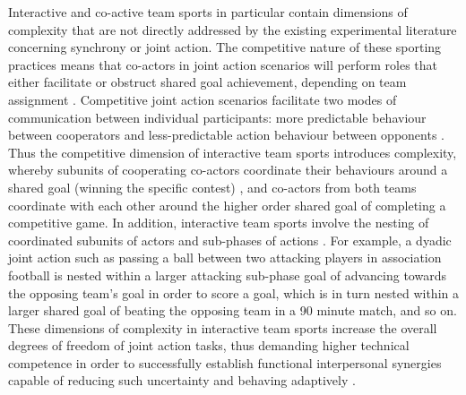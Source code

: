 Interactive and co-active team sports in particular contain dimensions of complexity that are not directly addressed by the existing experimental literature concerning synchrony or joint action.  The competitive nature of these sporting practices means that co-actors in joint action scenarios will perform roles that either facilitate or obstruct shared goal achievement, depending on team assignment \citep{Renshaw2009}. Competitive joint action scenarios facilitate two modes of communication between individual participants: more predictable behaviour between cooperators and less-predictable action behaviour between opponents \citep{Glover2017}. Thus the competitive dimension of interactive team sports introduces complexity, whereby subunits of cooperating co-actors coordinate their behaviours around a shared goal (winning the specific contest) \citep{Passos2012},  and co-actors from both teams coordinate with each other around the higher order shared goal of completing a competitive game.
In addition, interactive team sports involve the nesting of coordinated subunits of actors and sub-phases of actions \citep{Vilar2012}.  For example, a dyadic joint action such as passing a ball between two attacking players in association football is nested within a larger attacking sub-phase goal of advancing towards the opposing team's goal in order to score a goal, which is in turn nested within a larger shared goal of beating the opposing team in a 90 minute match, and so on.  These dimensions of complexity in interactive team sports increase the overall degrees of freedom of joint action tasks, thus demanding higher technical competence in order to successfully establish functional interpersonal synergies capable of reducing such uncertainty and behaving adaptively \citep{Duarte2012}.

